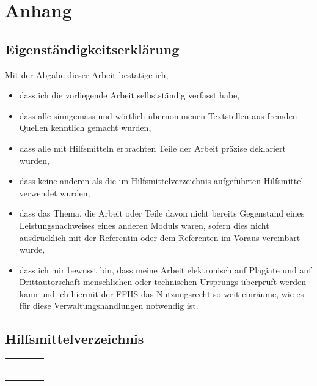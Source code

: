 \appendix
\chapter*{Anhang}
\section*{Eigenständigkeitserklärung}
Mit der Abgabe dieser Arbeit bestätige ich,

\begin{itemize}
    \item dass ich die vorliegende Arbeit selbstständig verfasst habe,
    \item dass alle sinngemäss und wörtlich übernommenen Textstellen aus fremden Quellen kenntlich gemacht wurden,
    \item dass alle mit Hilfsmitteln erbrachten Teile der Arbeit präzise deklariert wurden,
    \item dass keine anderen als die im Hilfsmittelverzeichnis aufgeführten Hilfsmittel verwendet wurden,
    \item dass das Thema, die Arbeit oder Teile davon nicht bereits Gegenstand eines Leistungsnachweises eines anderen Moduls waren, sofern dies nicht ausdrücklich mit der Referentin oder dem Referenten im Voraus vereinbart wurde,
    \item dass ich mir bewusst bin, dass meine Arbeit elektronisch auf Plagiate und auf Drittautorschaft menschlichen oder technischen Ursprungs überprüft werden kann und ich hiermit der FFHS das Nutzungsrecht so weit einräume, wie es für diese Verwaltungshandlungen notwendig ist.
\end{itemize}

\vspace{1em}
\section*{Hilfsmittelverzeichnis}
\begin{tabularx}{\linewidth}{@{}L | L | L@{}}
     &  &  \\
    - & - & - \\
\end{tabularx}